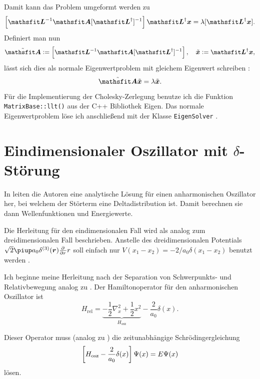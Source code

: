 Damit kann das Problem umgeformt werden zu \parencite[(3.31)]{MacKinnon/GEVP}
\[
    \sbr{\tens L^{-1} \tens A [\tens L^\dagger]^{-1}} \tens L^\dagger \vec x
    =
    \lambda [\tens L^\dagger \vec x].
\]
Definiert man nun
\[
    \tilde{\tens A} := \sbr{\tens L^{-1} \tens A [\tens L^\dagger]^{-1}}
    \eqnsep
    \tilde{\vec x} := \tens L^\dagger \vec x,
\]
lässt sich dies als normale Eigenwertproblem mit gleichem Eigenwert schreiben
\parencite[(3.32)]{MacKinnon/GEVP}:
\[
    \tilde{\tens A} \tilde{\vec x} = \lambda \tilde{\vec x}.
\]

Für die Implementierung der Cholesky-Zerlegung benutze ich die Funktion
\texttt{MatrixBase::llt()} \parencite{Eigen/LLT} aus der C++ Bibliothek Eigen.
Das normale Eigenwertproblem löse ich anschließend mit der Klasse
\texttt{EigenSolver} \parencite{Eigen/EigenSolver}.

\section{Eindimensionaler Oszillator mit \texorpdfstring{$\delta$}{delta}-Störung}


\newcommand\br[1]{\parencite[(#1)]{Busch/Two_Cold}}

In  leiten die Autoren eine analytische Lösung für
einen anharmonischen Oszillator her, bei welchem der Störterm eine
Deltadistribution ist. Damit berechnen sie dann Wellenfunktionen und
Energiewerte.

Die Herleitung für den eindimensionalen Fall wird als analog zum
dreidimensionalen Fall beschrieben. Anstelle des dreidimensionalen Potentials
$\sqrt 2 \piup a_0 \delta^{(3)}(\vec r) \pd{}r r$ soll einfach nur $V(x_1 -
x_2) = - 2/a_0 \delta(x_1 - x_2)$ benutzt werden
\parencite[Fußnote~20]{Busch/Two_Cold}.

Ich beginne meine Herleitung nach der Separation von Schwerpunkts- und
Relativbewegung analog zu \br2. Der Hamiltonoperator für den anharmonischen
Oszillator ist
\[
    H_\text{rel} = \underbrace{- \frac12 \nabla_x^2 + \frac 12
    x^2}_{H_\text{osz}} - \frac2{a_0} \delta(x).
\]

Dieser Operator muss (analog zu \br3) die zeitunabhängige Schrödingergleichung
\begin{equation}
    \label{eq:Bus_3}
    \sbr{H_\text{osz} - \frac2{a_0} \delta(x)} \Psi(x) = E \Psi(x)
\end{equation}
lösen.


